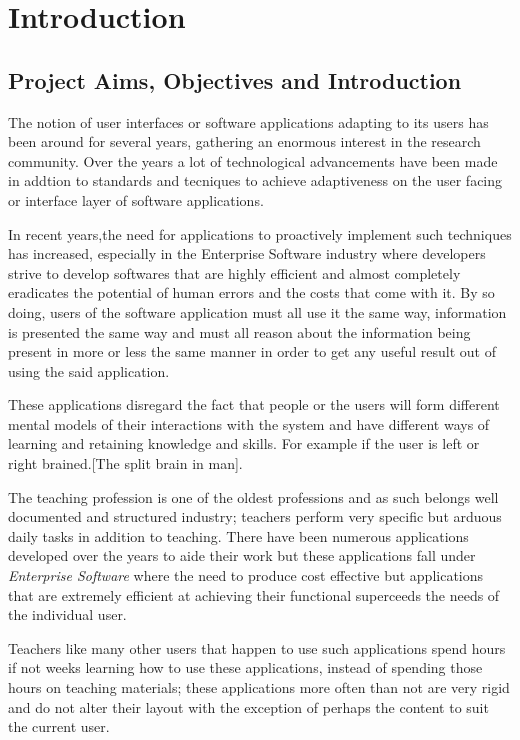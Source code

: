 \section{Introduction}
\subsection{Project Aims, Objectives and Introduction} 
The notion of user interfaces or software applications adapting to its users has been around for several years, gathering an enormous interest in the research community. Over the years a lot of technological advancements have been made in addtion to standards and tecniques to achieve adaptiveness on the user facing or interface layer of software applications.

In recent years,the need for applications to proactively implement such techniques has increased, especially in the Enterprise Software industry where developers strive to develop softwares that are highly efficient and almost completely eradicates the potential of human errors and the costs that come with it. By so doing, users of the software application must all use it the same way, information is presented the same way and must all reason about the information being present in more or less the same manner in order to get any useful result out of using the said application.

These applications disregard the fact that people or the users will form different mental models of their interactions with the system and have different ways of learning and retaining knowledge and skills. For example if the user is left or right brained.[The split brain in man].

The teaching profession is one of the oldest professions and as such belongs well documented and structured industry; teachers perform very specific but arduous daily tasks in addition to teaching. There have been numerous applications developed over the years to aide their work but these applications fall under \emph{Enterprise Software} where the need to produce cost effective but applications that are extremely efficient at achieving their functional superceeds the needs of the individual user.

Teachers like many other users that happen to use such applications spend hours if not weeks learning how to use these applications, instead of spending those hours on teaching materials; these applications more often than not are very rigid and do not alter their layout with the exception of perhaps the content to suit the current user.

